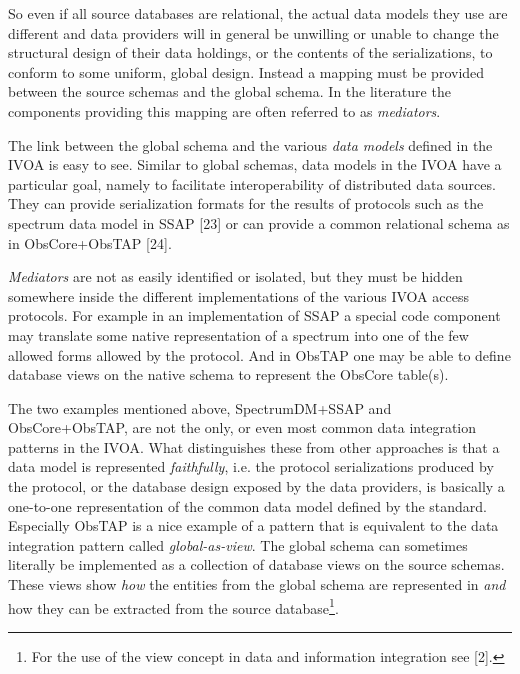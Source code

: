 \documentclass[10pt,a4paper]{ivoa}
\begin{document}
So even if all source databases are relational, the actual data models
they use are different and data providers will in general be unwilling
or unable to change the structural design of their data holdings, or the
contents of the serializations, to conform to some uniform, global
design. Instead a mapping must be provided between the source schemas
and the global schema. In the literature the components providing this
mapping are often referred to as \emph{mediators}.

The link between the global schema and the various \emph{data models}
defined in the IVOA is easy to see. Similar to global schemas, data
models in the IVOA have a particular goal, namely to facilitate
interoperability of distributed data sources. They can provide
serialization formats for the results of protocols such as the spectrum
data model in SSAP {[}23{]} or can provide a common relational schema as
in ObsCore+ObsTAP {[}24{]}.

\emph{Mediators} are not as easily identified or isolated, but they must
be hidden somewhere inside the different implementations of the various
IVOA access protocols. For example in an implementation of SSAP a
special code component may translate some native representation of a
spectrum into one of the few allowed forms allowed by the protocol. And
in ObsTAP one may be able to define database views on the native schema
to represent the ObsCore table(s).

The two examples mentioned above, SpectrumDM+SSAP and ObsCore+ObsTAP,
are not the only, or even most common data integration patterns in the
IVOA. What distinguishes these from other approaches is that a data
model is represented \emph{faithfully}, i.e. the protocol serializations
produced by the protocol, or the database design exposed by the data
providers, is basically a one-to-one representation of the common data
model defined by the standard. Especially ObsTAP is a nice example of a
pattern that is equivalent to the data integration pattern called
\emph{global-as-view}. The global schema can sometimes literally be
implemented as a collection of database views on the source schemas.
These views show \emph{how} the entities from the global schema are
represented in \emph{and} how they can be extracted from the source
database\footnote{For the use of the view concept in data and
  information integration see {[}2{]}.}.
\end{document}

